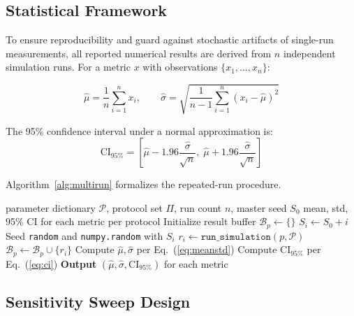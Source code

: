 \documentclass[journal]{IEEEtran}
\begin{document}
\subsection{Statistical Framework}

To ensure reproducibility and guard against stochastic artifacts of
single-run measurements, all reported numerical results are derived from
$n$ independent simulation runs. For a metric $x$ with observations
$\{x_1, \ldots, x_n\}$:

\begin{equation}
  \hat{\mu} = \frac{1}{n}\sum_{i=1}^{n} x_i, \qquad
  \hat{\sigma} = \sqrt{\frac{1}{n-1}\sum_{i=1}^{n}(x_i - \hat{\mu})^2}
  \label{eq:meanstd}
\end{equation}

The 95\% confidence interval under a normal approximation is:
\begin{equation}
  \mathrm{CI}_{95\%} = \left[\hat{\mu} - 1.96\frac{\hat{\sigma}}{\sqrt{n}},\;
                             \hat{\mu} + 1.96\frac{\hat{\sigma}}{\sqrt{n}}\right]
  \label{eq:ci}
\end{equation}

Algorithm~\ref{alg:multirun} formalizes the repeated-run procedure.

\begin{algorithm}[!t]
\caption{Multi-Run Statistical Evaluation Framework}
\label{alg:multirun}
\begin{algorithmic}[1]
  \Require parameter dictionary $\mathcal{P}$, protocol set $\Pi$,
           run count $n$, master seed $S_0$
  \Ensure mean, std, 95\% CI for each metric per protocol
    \State Initialize result buffer $\mathcal{B}_p \leftarrow \{\}$
      \State $S_i \leftarrow S_0 + i$ 
      \State Seed \texttt{random} and \texttt{numpy.random} with $S_i$
      \State $r_i \leftarrow \texttt{run\_simulation}(p, \mathcal{P})$
      \State $\mathcal{B}_p \leftarrow \mathcal{B}_p \cup \{r_i\}$
    \EndFor
    \State Compute $\hat{\mu}, \hat{\sigma}$ per Eq.~(\ref{eq:meanstd})
    \State Compute $\mathrm{CI}_{95\%}$ per Eq.~(\ref{eq:ci})
    \State \textbf{Output} $(\hat{\mu}, \hat{\sigma}, \mathrm{CI}_{95\%})$ for each metric
  \EndFor
\end{algorithmic}
\end{algorithm}

\subsection{Sensitivity Sweep Design}
\end{document}
